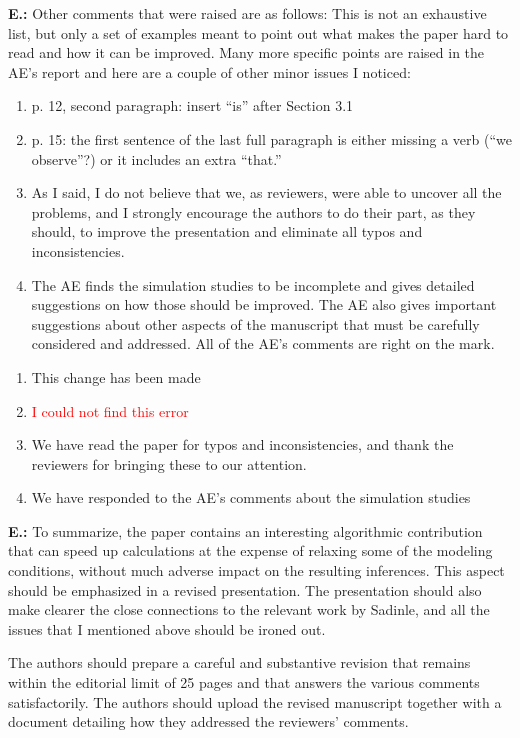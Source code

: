 \documentclass[letterpaper, parskip]{scrartcl}
\newcommand{\pointRaised}[2]{%
	\textbf{#1.\theresponsectr:} #2
}
\newcounter{responsectr}[section]     %
\newcommand{\reply}[1]{%
	\refstepcounter{responsectr}%
		\begin{tcolorbox}
			\itshape #1
		\end{tcolorbox}
}
\begin{document}
	\pointRaised{E}{%
		Other comments that were raised are as follows: This is not an exhaustive list, but only a set of examples meant to point out what makes the paper hard to read and how it can be improved.  Many more specific points are raised in the AE’s report and here are a couple of other minor issues I noticed:
	\begin{enumerate}
	\item p. 12, second paragraph:  insert “is” after Section 3.1

	\item p. 15:  the first sentence of the last full paragraph is either missing a verb (“we observe”?) or it includes an extra “that.”

	\item As I said, I do not believe that we, as reviewers, were able to uncover all the problems, and I strongly encourage the authors to do their part, as they should, to improve the presentation and eliminate all typos and inconsistencies.

	\item The AE finds the simulation studies to be incomplete and gives detailed suggestions on how those should be improved.  The AE also gives important suggestions about other aspects of the manuscript that must be carefully considered and addressed.  All of the AE’s comments are right on the mark.

	\end{enumerate}
	}

	\reply{%
		\begin{enumerate}
		\item This change has been made
		
		\item \textcolor{red}{I could not find this error}
		
		\item We have read the paper for typos and inconsistencies, and thank the reviewers for bringing these to our attention. 
		
		\item We have responded to the AE's comments about the simulation studies
		
	\end{enumerate}
}

\pointRaised{E}{To summarize, the paper contains an interesting algorithmic contribution that can speed up calculations at the expense of relaxing some of the modeling conditions, without much adverse impact on the resulting inferences.  This aspect should be emphasized in a revised presentation.  The presentation should also make clearer the close connections to the relevant work by Sadinle, and all the issues that I mentioned above should be ironed out.
	
The authors should prepare a careful and substantive revision that remains within the editorial limit of 25 pages and that answers the various comments satisfactorily.  The authors should upload the revised manuscript together with a document detailing how they addressed the reviewers’ comments.}
\end{document}
